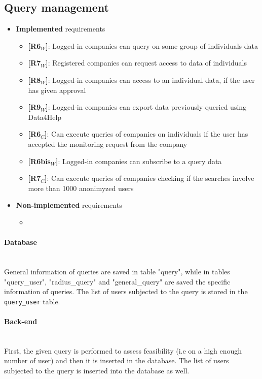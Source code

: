 \subsection{Query management}
\begin{itemize}
    \item \textbf{Implemented} requirements
        \begin{itemize}
    \item \textbf{[R6$_W$]}: Logged-in companies can query on some group of individuals data
    \item \textbf{[R7$_W$]}: Registered companies can request access to data of individuals
    \item \textbf{[R8$_W$]}: Logged-in companies can access to an individual data, if the user has given approval
    \item \textbf{[R9$_W$]}: Logged-in companies can export data previously queried using Data4Help

    \item \textbf{[R6$_C$]}: Can execute queries of companies on individuals if the user has accepted the monitoring request from the company
     \item \textbf{[R6bis$_W$]}: Logged-in companies can subscribe to a query data
    \item \textbf{[R7$_C$]}: Can execute queries of companies checking if the searches involve more than 1000 anonimyzed users 

        \end{itemize}
    \item \textbf{Non-implemented} requirements
    \begin{itemize}
            \item 
        \end{itemize}
\end{itemize}

\paragraph{Database} \mbox{}\\ 
General information of queries are saved in table "query", while in tables "query\_user", "radius\_query" and "general\_query" are saved the specific information of queries.
The list of users subjected to the query is stored in the \texttt{query\_user} table.

\paragraph{Back-end} \mbox{}\\  
First, the given query is performed to assess feasibility (i.e on a high enough number of user) and then it is inserted in the database.
The list of users subjected to the query is inserted into the database as well.

